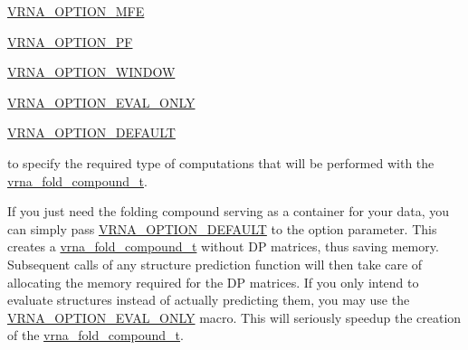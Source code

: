 \begin{DoxyItemize}
\item \mbox{\hyperlink{group__fold__compound_gae63be9127fe7dcc1f9bb14f5bb1064ee}{V\+R\+N\+A\+\_\+\+O\+P\+T\+I\+O\+N\+\_\+\+M\+FE}}
\item \mbox{\hyperlink{group__fold__compound_gabfbadcddda3e74ce7f49035ef8f058f7}{V\+R\+N\+A\+\_\+\+O\+P\+T\+I\+O\+N\+\_\+\+PF}}
\item \mbox{\hyperlink{group__fold__compound_ga2b2a8009ccdccc3eb1571556261aee8e}{V\+R\+N\+A\+\_\+\+O\+P\+T\+I\+O\+N\+\_\+\+W\+I\+N\+D\+OW}}
\item \mbox{\hyperlink{group__fold__compound_ga61469c423131552c8483229f8b6c7e0e}{V\+R\+N\+A\+\_\+\+O\+P\+T\+I\+O\+N\+\_\+\+E\+V\+A\+L\+\_\+\+O\+N\+LY}}
\item \mbox{\hyperlink{group__fold__compound_gacea5b7ee6181c485f36e2afa0e9089e4}{V\+R\+N\+A\+\_\+\+O\+P\+T\+I\+O\+N\+\_\+\+D\+E\+F\+A\+U\+LT}}
\end{DoxyItemize}

to specify the required type of computations that will be performed with the \mbox{\hyperlink{group__fold__compound_ga1b0cef17fd40466cef5968eaeeff6166}{vrna\+\_\+fold\+\_\+compound\+\_\+t}}.

If you just need the folding compound serving as a container for your data, you can simply pass \mbox{\hyperlink{group__fold__compound_gacea5b7ee6181c485f36e2afa0e9089e4}{V\+R\+N\+A\+\_\+\+O\+P\+T\+I\+O\+N\+\_\+\+D\+E\+F\+A\+U\+LT}} to the {\ttfamily option} parameter. This creates a \mbox{\hyperlink{group__fold__compound_ga1b0cef17fd40466cef5968eaeeff6166}{vrna\+\_\+fold\+\_\+compound\+\_\+t}} without DP matrices, thus saving memory. Subsequent calls of any structure prediction function will then take care of allocating the memory required for the DP matrices. If you only intend to evaluate structures instead of actually predicting them, you may use the \mbox{\hyperlink{group__fold__compound_ga61469c423131552c8483229f8b6c7e0e}{V\+R\+N\+A\+\_\+\+O\+P\+T\+I\+O\+N\+\_\+\+E\+V\+A\+L\+\_\+\+O\+N\+LY}} macro. This will seriously speedup the creation of the \mbox{\hyperlink{group__fold__compound_ga1b0cef17fd40466cef5968eaeeff6166}{vrna\+\_\+fold\+\_\+compound\+\_\+t}}.

